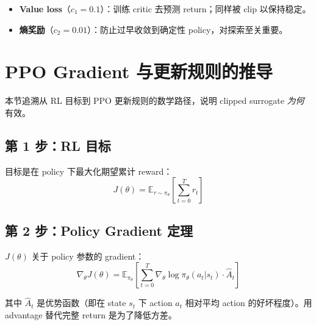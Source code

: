 \begin{itemize}
  \item \textbf{Value loss}（$c_1 = 0.1$）：训练 critic 去预测 return；同样被 clip 以保持稳定。
  \item \textbf{熵奖励}（$c_2 = 0.01$）：防止过早收敛到确定性 policy，对探索至关重要。
\end{itemize}

\section{PPO Gradient 与更新规则的推导}
\label{derivation-of-the-ppo-gradient-and-update-rule}

本节追溯从 RL 目标到 PPO 更新规则的数学路径，说明 clipped surrogate \emph{为何}有效。

\subsection{第 1 步：RL 目标}
\label{step-1-the-rl-objective}

目标是在 policy 下最大化期望累计 reward：
\begin{equation}
J(\theta) = \mathbb{E}_{\tau \sim \pi_\theta}\left[\sum_{t=0}^T r_t\right]
\end{equation}

\subsection{第 2 步：Policy Gradient 定理}
\label{step-2-policy-gradient-theorem}

$J(\theta)$ 关于 policy 参数的 gradient：
\begin{equation}
\boxed{\nabla_\theta J(\theta) = \mathbb{E}_{\pi_\theta}\left[\sum_{t=0}^T \nabla_\theta \log \pi_\theta(a_t|s_t) \cdot \hat{A}_t\right]}
\end{equation}

其中 $\hat{A}_t$ 是优势函数（即在 state $s_t$ 下 action $a_t$ 相对平均 action 的好坏程度）。用 advantage 替代完整 return 是为了降低方差。

